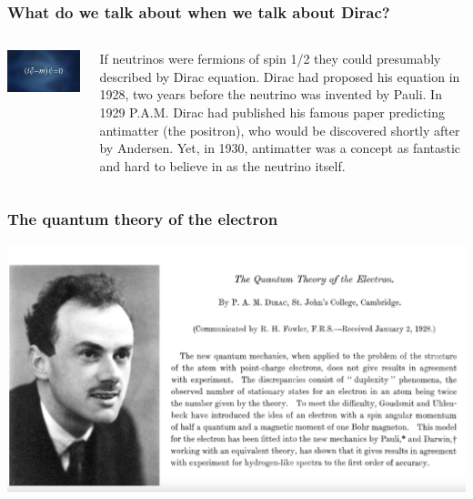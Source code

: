\begin{frame}
\frametitle{What do we talk about when we talk about Dirac?}
\begin{columns}
\includegraphics[scale=0.20]{img/dirac-eq.png}
 
If neutrinos were fermions of spin 1/2 they could presumably described by Dirac equation. Dirac had proposed his equation in 1928, two years before the neutrino was invented by Pauli.  In 1929 P.A.M. Dirac had published his famous paper predicting antimatter (the positron), who would be discovered shortly after by Andersen. Yet, in 1930, antimatter was a concept as fantastic and hard to believe in as the neutrino itself.  

\end{columns}
\end{frame}

\begin{frame}
\frametitle{The quantum theory of the electron}

\includegraphics[scale=0.3]{img/dirac-eq-paper.png}
 
\end{frame}

